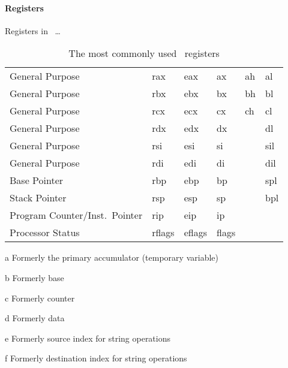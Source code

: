 \paragraph{Registers}\label{par:reg}
Registers in \arch\ \todo\dots
\begin{table*}
  \centering
  \renewcommand\theadfont{\normalcolor\normalsize\normalfont}
  \begin{threeparttable}
    \caption{The most commonly used \arch\ registers}\label{tbl:regs}
    \begin{tabular}{lAAAAA}
      \toprule
       &  &  &
       &  &  \\
      \midrule
      General Purpose & rax & eax & ax & ah & al \\
      General Purpose & rbx & ebx & bx & bh & bl \\
      General Purpose & rcx & ecx & cx & ch & cl \\
      General Purpose & rdx & edx & dx & & dl \\
      General Purpose & rsi & esi & si & & sil \\
      General Purpose & rdi & edi & di & & dil \\
      Base Pointer & rbp & ebp & bp & & spl \\
      Stack Pointer & rsp & esp & sp & & bpl \\
      Program Counter/Inst.\ Pointer & rip & eip & ip \\
      Processor Status & rflags & eflags & flags \\
      \bottomrule
    \end{tabular}
    \begin{tablenotes}
      \item[a] Formerly the primary accumulator (temporary variable)%
      \item[b] Formerly base%
      \item[c] Formerly counter%
      \item[d] Formerly data%
      \item[e] Formerly source index for string operations
      \item[f] Formerly destination index for string operations
    \end{tablenotes}
  \end{threeparttable}
\end{table*}

